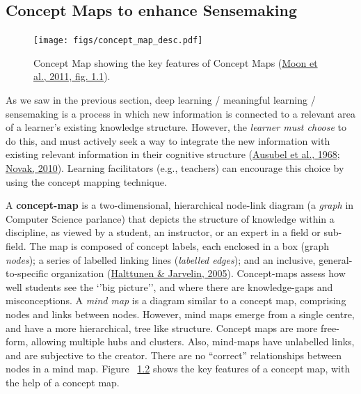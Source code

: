 \documentclass[a4paper, nobind]{templates/ociamthesis}
\begin{document}
\hypertarget{sec:bg_concept_maps}{%
\subsection{Concept Maps to enhance Sensemaking}\label{sec:bg_concept_maps}}

\begin{figure}
\hypertarget{fig_concept_map_desc}{%
\centering
\texttt{[image: figs/concept\_map\_desc.pdf]}
\caption{Concept Map showing the key features of Concept Maps
(\protect\hyperlink{ref-moon2011applieda}{Moon et al., 2011, fig. 1.1}).}\label{fig_concept_map_desc}
}
\end{figure}

As we saw in the previous section, deep learning / meaningful learning /
sensemaking is a process in which new information is connected to a
relevant area of a learner's existing knowledge structure. However, the
\emph{learner must choose} to do this, and must actively seek a way to
integrate the new information with existing relevant information in
their cognitive structure
(\protect\hyperlink{ref-ausubel1968educational}{Ausubel et al., 1968}; \protect\hyperlink{ref-novak2010learninga}{Novak, 2010}). Learning facilitators
(e.g., teachers) can encourage this choice by using the concept mapping
technique.

A \textbf{concept-map} is a two-dimensional, hierarchical node-link diagram
(a \emph{graph} in Computer Science parlance) that depicts the structure of
knowledge within a discipline, as viewed by a student, an instructor, or
an expert in a field or sub-field. The map is composed of concept
labels, each enclosed in a box (graph \emph{nodes}); a series of labelled
linking lines (\emph{labelled edges}); and an inclusive, general-to-specific
organization (\protect\hyperlink{ref-halttunen2005assessing}{Halttunen \& Jarvelin, 2005}). Concept-maps assess how well
students see the `'big picture'', and where there are knowledge-gaps and
misconceptions. A \emph{mind map} is a diagram similar to a concept map,
comprising nodes and links between nodes. However, mind maps emerge from
a single centre, and have a more hierarchical, tree like structure.
Concept maps are more free-form, allowing multiple hubs and clusters.
Also, mind-maps have unlabelled links, and are subjective to the
creator. There are no ``correct'' relationships between nodes in a mind
map. Figure ~\protect\hyperlink{fig_concept_map_desc}{1.2} shows the key features of a concept
map, with the help of a concept map.
\end{document}
